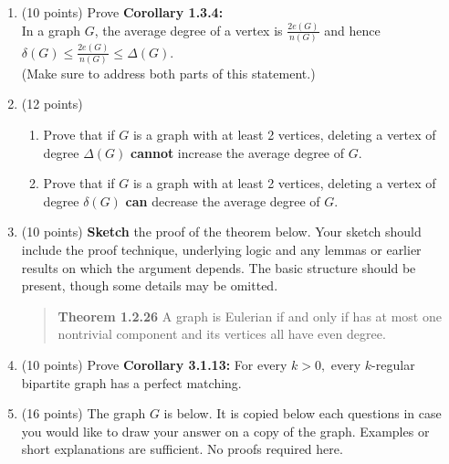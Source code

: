 \documentclass{amsart}
\newcommand{\vertex}{\node[vertex]}
\begin{document}
\begin{enumerate}
\item (10 points) Prove \textbf{Corollary 1.3.4:}\\ 
In a graph $G$, the average degree of a vertex is $\displaystyle{\frac{2 e(G)}{n(G)}}$ and hence $\displaystyle{\delta(G) \leq \frac{2 e(G)}{n(G)} \leq \Delta(G).}$\\
(Make sure to address both parts of this statement.)

\newpage
\item (12 points) \begin{enumerate}
	\item Prove that if $G$ is a graph with at least 2 vertices, deleting a vertex of degree $\Delta(G)$ \textbf{cannot} increase the average degree of $G.$
	\vfill
	\item Prove that if $G$ is a graph with at least 2 vertices, deleting a vertex of degree $\delta(G)$ \textbf{can} decrease the average degree of $G.$
	\vspace{3in}
	\end{enumerate}
\newpage
\item (10 points) \textbf{Sketch} the proof of the theorem below. Your sketch should include the proof technique, underlying logic and any lemmas or earlier results on which the argument depends. The basic structure should be present, though some details may be omitted.\\

\begin{quote} \textbf{Theorem 1.2.26} A graph is Eulerian if and only if has at most one nontrivial component and its vertices all have even degree.\end{quote}
\newpage
\item (10 points) Prove \textbf{Corollary 3.1.13:} For every $k > 0,$ every $k$-regular bipartite graph has a perfect matching. \\
\newpage
\item (16 points) The graph $G$ is below. It is copied below each questions in case you would like to draw your answer on a copy of the graph. Examples or short explanations are sufficient. No proofs required here.\\



\end{enumerate}
\end{document}
